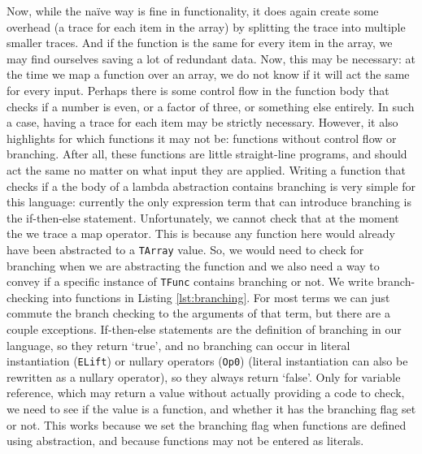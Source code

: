         Now, while the naïve way is fine in functionality, it does again create some overhead (a trace for each item in the array) by splitting the trace into multiple smaller traces.
        And if the function is the same for every item in the array, we may find ourselves saving a lot of redundant data.
        Now, this may be necessary: at the time we map a function over an array, we do not know if it will act the same for every input.
        Perhaps there is some control flow in the function body that checks if a number is even, or a factor of three, or something else entirely.
        In such a case, having a trace for each item may be strictly necessary.
        However, it also highlights for which functions it may not be: functions without control flow or branching.
        After all, these functions are little straight-line programs, and should act the same no matter on what input they are applied.
        Writing a function that checks if a the body of a lambda abstraction contains branching is very simple for this language: currently the only expression term that can introduce branching is the if-then-else statement.
        Unfortunately, we cannot check that at the moment the we trace a map operator.
        This is because any function here would already have been abstracted to a \texttt{TArray} value.
        So, we would need to check for branching when we are abstracting the function and we also need a way to convey if a specific instance of \texttt{TFunc} contains branching or not.
        We write branch-checking into functions in Listing \ref{lst:branching}.
        For most terms we can just commute the branch checking to the arguments of that term, but there are a couple exceptions.
        If-then-else statements are the definition of branching in our language, so they return `true', and no branching can occur in literal instantiation (\texttt{ELift}) or nullary operators (\texttt{Op0}) (literal instantiation can also be rewritten as a nullary operator), so they always return `false'.
        Only for variable reference, which may return a value without actually providing a code to check, we need to see if the value is a function, and whether it has the branching flag set or not.
        This works because we set the branching flag when functions are defined using abstraction, and because functions may not be entered as literals.

